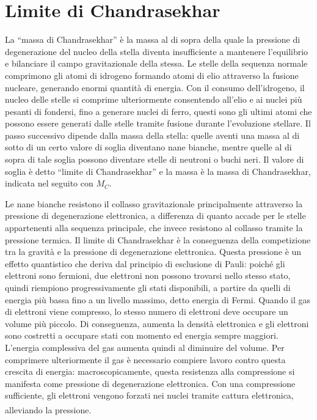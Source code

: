 \documentclass{article}
\newcommand{\supcite}[2][]{\textsuperscript{\cite[#1]{#2}}}
\numberwithin{equation}{section}
\begin{document}
\section{Limite di Chandrasekhar}
La ``massa di Chandrasekhar'' è la massa al di sopra della quale la pressione di degenerazione del nucleo della stella diventa insufficiente a mantenere l'equilibrio e bilanciare il campo gravitazionale della stessa. Le stelle della sequenza normale comprimono gli atomi di idrogeno formando atomi di elio attraverso la fusione nucleare, generando enormi quantità di energia. Con il consumo dell'idrogeno, il nucleo delle stelle si comprime ulteriormente consentendo all'elio e ai nuclei più pesanti di fondersi, fino a generare nuclei di ferro, questi sono gli ultimi atomi che possono essere generati dalle stelle tramite fusione durante l'evoluzione stellare. Il passo successivo dipende dalla massa della stella: quelle aventi una massa al di sotto di un certo valore di soglia diventano nane bianche, mentre quelle al di sopra di tale soglia possono diventare stelle di neutroni o buchi neri. Il valore di soglia è detto ``limite di Chandrasekhar'' e la massa è la massa di Chandrasekhar, indicata nel seguito con $M_C$. 

Le nane bianche resistono il collasso gravitazionale principalmente attraverso la pressione di degenerazione elettronica, a differenza di quanto accade per le stelle appartenenti alla sequenza principale, che invece resistono al collasso tramite la pressione termica. Il limite di Chandrasekhar è la conseguenza della competizione tra la gravità e la pressione di degenerazione elettronica. Questa pressione è un effetto quantistico che deriva dal principio di esclusione di Pauli: poiché gli elettroni sono fermioni, due elettroni non possono trovarsi nello stesso stato, quindi riempiono progressivamente gli stati disponibili, a partire da quelli di energia più bassa fino a un livello massimo, detto energia di Fermi. Quando il gas di elettroni viene compresso, lo stesso numero di elettroni deve occupare un volume più piccolo. Di conseguenza, aumenta la densità elettronica e gli elettroni sono costretti a occupare stati con momento ed energia sempre maggiori. L'energia complessiva del gas aumenta quindi al diminuire del volume. Per comprimere ulteriormente il gas è necessario compiere lavoro contro questa crescita di energia: macroscopicamente, questa resistenza alla compressione si manifesta come pressione di degenerazione elettronica. Con una compressione sufficiente, gli elettroni vengono forzati nei nuclei tramite cattura elettronica, alleviando la pressione\supcite[cap.~X]{chandrasekhar1957}. 
\end{document}
